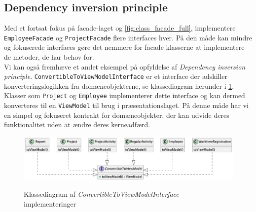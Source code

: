 \subsection{Dependency inversion principle} \label{sec:solid_d}
Med et fortsat fokus på facade-laget og \ref{fig:class_facade_full}, implementere \texttt{EmployeeFacade} og \texttt{ProjectFacade} flere interfaces hver. På den måde kan mindre og fokuserede interfaces gøre det nemmere for facade klasserne at implementere de metoder, de har behov for.
\\
Vi kan også fremhæve et andet eksempel på opfyldelse af \textit{Dependency inversion principle}. \texttt{ConvertibleToViewModelInterface} er et interface der adskiller konverteringslogikken fra domæneobjekterne, se klassediagram herunder i \ref{fig:class_convertible_example}. Klasser som \texttt{Project} og \texttt{Employee} implementerer dette interface og kan dermed konverteres til en \texttt{ViewModel} til brug i præsentationslaget. På denne måde har vi en simpel og fokuseret kontrakt for domæneobjekter, der kan udvide deres funktionalitet uden at ændre deres kerneadfærd. 

\begin{figure}[H]
    \centering
    \caption{Klassediagram af \textit{ConvertibleToViewModelInterface} implementeringer}
    \includegraphics[width = \textwidth, keepaspectratio]{TaskFusion/out/assets/diagrams/class_convertibleToViewModel_example/ConvertibleToViewModel_diagram.png}
    \label{fig:class_convertible_example}
\end{figure}

